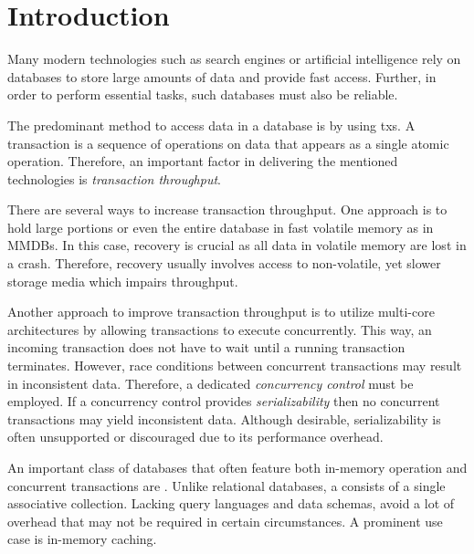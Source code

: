\chapter{Introduction}
\label{ch:intro}



Many modern technologies such as search engines or artificial intelligence rely
on databases to store large amounts of data and provide fast access. Further, in
order to perform essential tasks, such databases must also be reliable.

The predominant method to access data in a database is by using \glspl{tx}. A
transaction is a sequence of operations on data that appears as a single atomic
operation. Therefore, an important factor in delivering the mentioned
technologies is \emph{transaction throughput}.

There are several ways to increase transaction throughput. One approach is to
hold large portions or even the entire database in fast volatile memory as in
\acp{MMDB}. In this case, recovery is crucial as all data in volatile memory are
lost in a crash. Therefore, recovery usually involves access to non-volatile,
yet slower storage media which impairs throughput.

Another approach to improve transaction throughput is to utilize multi-core
architectures by allowing transactions to execute concurrently. This way, an
incoming transaction does not have to wait until a running transaction
terminates. However, race conditions between concurrent transactions may result
in inconsistent data. Therefore, a dedicated \emph{concurrency control} must be
employed. If a concurrency control provides \emph{serializability} then no
concurrent transactions may yield inconsistent data. Although desirable,
serializability is often unsupported or discouraged due to its performance
overhead.

An important class of databases that often feature both in-memory operation and
concurrent transactions are \emph{\kvsp}. Unlike relational databases, a \kvs
consists of a single associative collection. Lacking query languages and data
schemas, \kvsp avoid a lot of overhead that may not be required in certain
circumstances. A prominent use case is in-memory caching.


